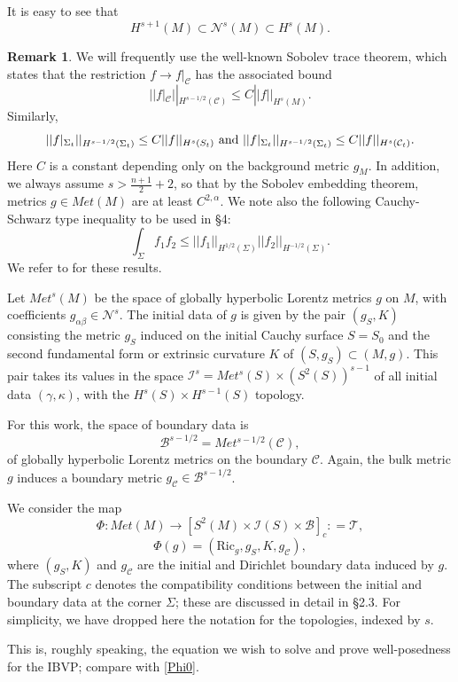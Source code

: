 \documentclass[10pt]{amsart}
\renewcommand{\a}{\alpha}
\renewcommand{\b}{\beta}
\newcommand{\g}{\gamma}
\newcommand{\Si}{\Sigma}
\renewcommand{\k}{\kappa}
\newcommand{\cC}{{\mathcal C}}
\newcommand{\cT}{{\mathcal T}}
\newcommand{\cB}{{\mathcal B}}
\newcommand{\cN}{{\mathcal N}}
\newcommand{\cI}{\mathcal I}
\newcommand{\Ric}{\mathrm{Ric}}
\newcommand{\be}{\begin{equation}}
\newcommand{\ee}{\end{equation}}
\renewcommand{\to}{\rightarrow}
\newcommand{\<}{\langle}
\renewcommand{\>}{\rangle}
\theoremstyle{plain}
\theoremstyle{remark}
\theoremstyle{definition}
\newtheorem{remark}[lemma]{Remark}
\numberwithin{equation}{section}
\begin{document}
 It is easy to see that 
$$H^{s+1}(M) \subset \cN^s(M) \subset H^s(M).$$

\begin{remark} 
{\rm We will frequently use the well-known Sobolev trace theorem, which states that the restriction $f \to f|_{\cC}$ has the 
associated bound  
\be \label{Sob1}
||f|_\cC||_{H^{s-1/2}(\cC)} \leq C ||f||_{H^s(M)}.
\ee
Similarly, 
\be \label{Sob2}
||f|_{\Si_t}||_{H^{s-1/2}(\Si_t)} \leq C ||f||_{H^s(S_t)} \ {\rm and} \ ||f|_{\Si_t}||_{H^{s-1/2}(\Si_t)} \leq C ||f||_{H^s(\cC_t)} .
\ee
Here $C$ is a constant depending only on the background metric $g_M$. In addition, we always assume $s > \frac{n+1}{2} + 2$, so that by the Sobolev 
embedding theorem, metrics $g \in Met(M)$ are at least $C^{2,\a}$. We note also the following Cauchy-Schwarz type inequality to be used 
in \S 4:
\be \label{Sob3}
\int_{\Si}f_1 f_2 \leq ||f_1||_{H^{1/2}(\Si)} ||f_2||_{H^{-1/2}(\Si)}.
\ee
We refer to \cite{Ad} for these results.   
}
\end{remark}

 Let $Met^s(M)$ be the space of globally hyperbolic Lorentz metrics $g$ on $M$, with coefficients $g_{\a\b} \in \cN^s$. The initial data 
 of $g$ is given by the pair $(g_S, K)$ consisting the metric $g_S$ induced on the initial Cauchy surface $S = S_0$ and the 
 second fundamental form or extrinsic curvature $K$ of $(S, g_S) \subset (M, g)$. This pair takes its values in the space 
 $\cI^s = Met^s(S)\times (S^2(S))^{s-1}$ of all initial data $(\g, \k)$, with the $H^s(S) \times H^{s-1}(S)$ topology.  
 
   For this work, the space of boundary data is 
 $$\cB^{s-1/2} = Met^{s-1/2}(\cC),$$
 of globally hyperbolic Lorentz metrics on the boundary $\cC$. Again, the bulk metric $g$ induces a boundary metric $g_{\cC} \in \cB^{s-1/2}$. 
  

  We consider the map 
\be \label{Phi}
\Phi: Met(M) \to [S^2(M) \times \cI(S)\times \cB]_c : = \cT,
\ee
$$\Phi(g) = (\Ric_g, g_S, K, g_{\cC}),$$
where $(g_S, K)$ and $g_{\cC}$ are the initial and Dirichlet boundary data induced by $g$. The subscript $c$ denotes the compatibility 
conditions between the initial and boundary data at the corner $\Si$; these are discussed in detail in \S 2.3. For simplicity, we have dropped 
here the notation for the topologies, indexed by $s$. 

This is, roughly speaking, the equation we wish to solve and prove well-posedness for the IBVP; compare with \eqref{Phi0}.  

\medskip 
\end{document}
